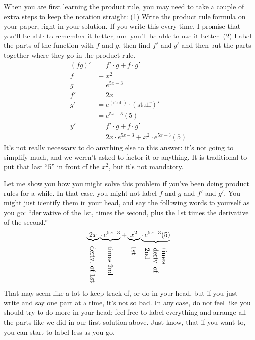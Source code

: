 \documentclass[oneside]{book}
\theoremstyle{definition}
\theoremstyle{solution}
\newtheorem*{solution}{Solution}
\newenvironment{solution}{\vspace{2in}\comment}{\endcomment}
\begin{document}
\begin{solution}
  When you are first learning the product rule, you may need to take a
  couple of extra steps to keep the notation straight: (1) Write the
  product rule formula on your paper, right in your solution.  If you
  write this every time, I promise that you'll be able to remember it
  better, and you'll be able to use it better.  (2) Label the parts of
  the function with $f$ and $g$, then find $f'$ and $g'$ and then put
  the parts together where they go in the product rule.
\begin{align*}
(fg)' & = f'\cdot g + f\cdot g'                   \\
f     & = x^2                                     \\
g     & = e^{5x-3}                                \\
f'    & = 2x                                      \\
g'    & = e^{(\text{stuff})}\cdot (\text{stuff})' \\
      & = e^{5x-3}(5)                             \\
y'    & = f'\cdot g + f\cdot g'                   \\
      & = 2x \cdot e^{5x-3} + x^2 \cdot e^{5x-3}(5)
\end{align*}
It's not really necessary to do anything else to this answer: it's not
going to simplify much, and we weren't asked to factor it or anything.
It is traditional to put that last ``5'' in front of the $x^2$, but
it's not mandatory.

Let me show you how you might solve this problem if you've been doing
product rules for a while.  In that case, you might not label $f$ and
$g$ and $f'$ and $g'$.  You might just identify them in your head, and
say the following words to yourself as you go: ``derivative of the
1st, times the second, plus the 1st times the derivative of the
second.''
$$
\underbrace{2x}_{\rotatebox{-90}{deriv. of 1st}}
\underbrace{\cdot \,e^{5x-3}}_{\rotatebox{-90}{times 2nd}} 
+
\underbrace{x^2}_{\rotatebox{-90}{1st}}
\underbrace{\cdot \,e^{5x-3}(5)}_{\rotatebox{-90}{\parbox{0.5in}{times deriv of 2nd}}}
$$
That may seem like a lot to keep track of, or do in your head, but if
you just write and say one part at a time, it's not so bad.  In any
case, do not feel like you should try to do more in your head; feel
free to label everything and arrange all the parts like we did in our
first solution above.  Just know, that if you want to, you can start
to label less as you go.
\end{solution}
\end{document}
